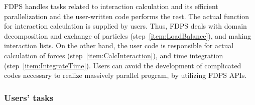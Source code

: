FDPS handles tasks related to interaction calculation and its
efficient parallelization and the user-written code performs the rest.
The actual function for interaction calculation is supplied by
users. Thus, FDPS deals with domain decomposition and exchange of
particles (step~\ref{item:LoadBalance}), and making interaction
lists. On the other hand, the user code is responsible for actual
calculation of forces (step~\ref{item:CalcInteraction}), and time
integration (step~\ref{item:IntegrateTime}). Users can avoid the
development of complicated codes necessary to realize massively
parallel program, by utilizing FDPS APIs.

\subsubsection{Users' tasks}

